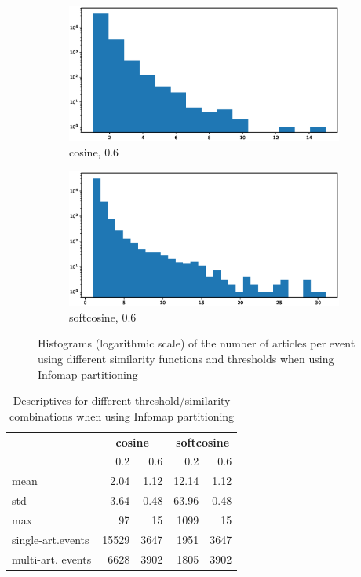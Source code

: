 \documentclass[a4paper,man,natbib,floatsintext,mask]{apa6}
\begin{document}
\begin{figure}[h!]
\begin{subfigure}{.5\textwidth}
  \centering
  \includegraphics[width=.8\linewidth]{figures/infomapcos06.eps}  
  \caption{cosine, 0.6}
  \label{fig:sub-infomapcos02}
\end{subfigure}
\begin{subfigure}{.5\textwidth}
  \centering
  \includegraphics[width=.8\linewidth]{figures/infomapsoft06.eps}  
  \caption{softcosine, 0.6}
  \label{fig:sub-infomapsoftcos02}
\end{subfigure}
\caption{Histograms (logarithmic scale) of the number of articles per event using different similarity functions and thresholds when using Infomap partitioning}
\label{fig:infomap}
\end{figure}



\begin{table}[h]
\caption{Descriptives for different threshold/similarity combinations when using Infomap partitioning\label{tab:thresholds_infomap}}

\centering
\begin{tabular}{lrrrr}
\toprule
{} & \multicolumn{2}{c}{\textbf{cosine}} & \multicolumn{2}{c}{\textbf{softcosine}} \\
{} &    0.2 & 0.6 & 0.2 & 0.6 \\
\midrule
mean                 & 2.04   &  1.12  &  12.14  &  1.12\\
std                  &  3.64  &  0.48  &  63.96  &  0.48\\
max                  &  97    &  15    &  1099   &  15\\
single-art.events &  15529 &  3647  &  1951   &  3647\\
multi-art. events  &  6628  &  3902  &  1805   &  3902\\
\bottomrule
\end{tabular}
\end{table}





\end{document}
